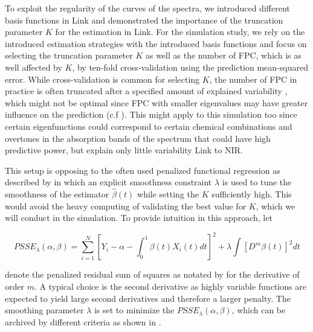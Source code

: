 \documentclass[11pt,twoside,a4paper]{article}
\begin{document}
	To exploit the regularity of the curves of the spectra, we introduced different basis functions in {\color{green} Link} and demonstrated the importance of the truncation parameter $K$ for the estimation in {\color{green} Link}. For the simulation study, we rely on the introduced estimation strategies with the introduced basis functions and focus on selecting the truncation parameter $K$ as well as the number of FPC, which is as well affected by $K$, by ten-fold cross-validation using the prediction mean-squared error. While cross-validation is common for selecting $K$, the number of FPC in practice is often truncated after a specified amount of explained variability \cite{kokoszka_introduction_2017}, which might not be optimal since FPC with smaller eigenvalues may have greater influence on the prediction (c.f \cite{Jolliffe_1982}). This might apply to this simulation too since certain eigenfunctions could correspond to certain chemical combinations and overtones in the absorption bands of the spectrum that could have high predictive power, but explain only little variability {\color{green} Link to NIR}.
	 
	This setup is opposing to the often used penalized functional regression as described by \cite{Goldsmith_2011} in which an explicit smoothness constraint $\lambda$ is used to tune the smoothness of the estimator $\hat{\beta}(t)$ while setting the $K$ sufficiently high. This would avoid the heavy computing of validating the best value for $K$, which we will conduct in the simulation. To provide intuition in this approach, let 
	
	 \begin{equation}
	 	PSSE_\lambda(\alpha, \beta) = \sum_{i = 1}^{N} \left[ Y_i -\alpha -\int_0^1 \beta(t)X_i(t)dt \right]^2 + \lambda \int \left[D^m\beta(t)\right]^2 dt
	 \end{equation}
 
	 denote the penalized residual sum of squares as notated by \cite{ramsay_functional_2005} for the derivative of order $m$. A typical choice is the second derivative as highly variable functions are expected to yield large second derivatives and therefore a larger penalty. The smoothing parameter $\lambda$ is set to minimize the $PSSE_\lambda(\alpha, \beta)$, which can be archived by different criteria as shown in \cite{ThomasLee_2003}.
		
		
\end{document}
